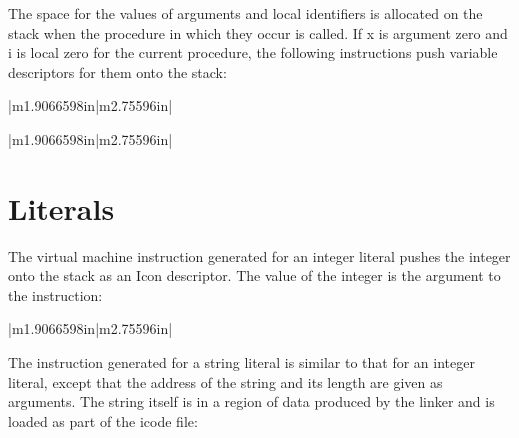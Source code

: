 The space for the values of arguments and local identifiers is
allocated on the stack when the procedure in which they occur is
called. If x is argument zero and i is local zero for the current
procedure, the following instructions push variable descriptors for
them onto the stack:

\begin{flushleft}
\tablelasttail{\hline}
\begin{xtabular}{|m{1.9066598in}|m{2.75596in}|}

\end{xtabular}
\end{flushleft}

\bigskip

\begin{flushleft}
\tablelasttail{\hline}
\begin{xtabular}{|m{1.9066598in}|m{2.75596in}|}

\end{xtabular}
\end{flushleft}


\section{Literals}

The virtual machine instruction generated for an integer literal
pushes the integer onto the stack as an Icon descriptor. The value of
the integer is the argument to the instruction:

\begin{flushleft}
\tablelasttail{\hline}
\begin{xtabular}{|m{1.9066598in}|m{2.75596in}|}

\end{xtabular}
\end{flushleft}

The instruction generated for a string literal is similar to that for
an integer literal, except that the address of the string and its
length are given as arguments. The string itself is in a region of
data produced by the linker and is loaded as part of the icode file:

